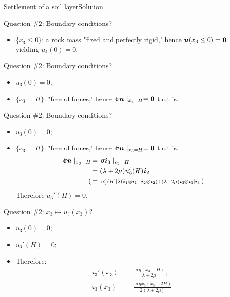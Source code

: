 \documentclass{beamer}
\newcommand{\uj}{u}
\newcommand{\xj}{x}
\newcommand{\uv}{{\boldsymbol\uj}}
\renewcommand{\ij}{i}
\newcommand{\iv}{{\boldsymbol\ij}}
\newcommand{\nj}{n}
\newcommand{\nv}{{\boldsymbol\nj}}
\newcommand{\roi}{\varrho}
\newcommand{\stress}{\mbox{$\hspace{0.3em}\rotatebox[x=0pt,y=0.2pt]{90}{\rule{0.017\linewidth}{0.4pt}}\hspace{-0.25em}\upsigma$}}
\newcommand{\bzero}{{\bf 0}}
\begin{document}
\begin{frame}{Settlement of a soil layer}{Solution}

\begin{overprint}

\vskip-20pt
\begin{exampleblock}{Question \#2: Boundary conditions?}
\begin{itemize}
\item $\{\xj_3\leq 0\}$: a rock mass "fixed and perfectly rigid," hence $\uv(\xj_3\leq 0)=\bzero$ yielding $\uj_3(0)=0$.
\end{itemize}
\end{exampleblock}

\vskip-20pt
\begin{exampleblock}{Question \#2: Boundary conditions?}
\begin{itemize}
\item $\uj_3(0)=0$;
\item $\{\xj_3=H\}$: "free of forces," hence $\stress\nv\mid_{\xj_3=H}=\bzero$ that is:
\end{itemize}
\end{exampleblock}

\vskip-20pt
\begin{exampleblock}{Question \#2: Boundary conditions?}
\begin{itemize}
\item $\uj_3(0)=0$;
\item $\{\xj_3=H\}$: "free of forces," hence $\stress\nv\mid_{\xj_3=H}=\bzero$ that is:
\begin{displaymath}
\begin{split}
\stress\nv\mid_{\xj_3=H} &= \stress\iv_3\mid_{\xj_3=H} \\
&= (\lambda+2\mu)\uj_3'(H)\iv_3 \\
(&= \,{\scriptstyle \uj_3'(H)\left[\lambda(\iv_1\otimes\iv_1+\iv_2\otimes\iv_2)+(\lambda+2\mu)\iv_3\otimes\iv_3\right]\iv_3}\,)
\end{split}
\end{displaymath}
Therefore $\uj_3'(H)=0$.
\end{itemize}
\end{exampleblock}

\vskip-20pt
\begin{exampleblock}{Question \#2: $\xj_3\mapsto\uj_3(\xj_3)$?}
\begin{itemize}
\item $\uj_3(0)=0$;
\item $\uj_3'(H)=0$;
\item Therefore:
\begin{displaymath}
\begin{split}
\uj_3'(\xj_3) &=\frac{\roi g(\xj_3-H)}{\lambda+2\mu}\,, \\
\uj_3(\xj_3) &=\frac{\roi g\xj_3(\xj_3-2H)}{2(\lambda+2\mu)}\,.
\end{split}
\end{displaymath}
\end{itemize}
\end{exampleblock}


\end{overprint}
\end{frame}
\end{document}

